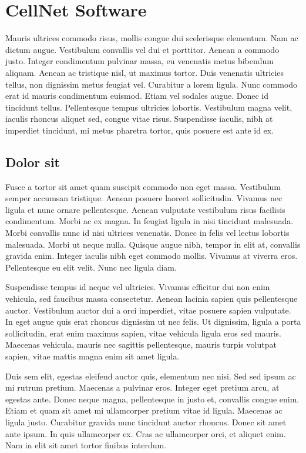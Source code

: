 \section{CellNet Software}
\label{sec:ipsum}
Mauris ultrices commodo risus, mollis congue dui scelerisque elementum. Nam ac dictum augue. Vestibulum convallis vel dui et porttitor. Aenean a commodo justo. Integer condimentum pulvinar massa, eu venenatis metus bibendum aliquam. Aenean ac tristique nisl, ut maximus tortor. Duis venenatis ultricies tellus, non dignissim metus feugiat vel. Curabitur a lorem ligula. Nunc commodo erat id mauris condimentum euismod. Etiam vel sodales augue. Donec id tincidunt tellus. Pellentesque tempus ultricies lobortis. Vestibulum magna velit, iaculis rhoncus aliquet sed, congue vitae risus. Suspendisse iaculis, nibh at imperdiet tincidunt, mi metus pharetra tortor, quis posuere est ante id ex.

\subsection{Dolor sit} %
\label{sub:dolor_sit}
Fusce a tortor sit amet quam suscipit commodo non eget massa. Vestibulum semper accumsan tristique. Aenean posuere laoreet sollicitudin. Vivamus nec ligula et nunc ornare pellentesque. Aenean vulputate vestibulum risus facilisis condimentum. Morbi ac ex magna. In feugiat ligula in nisi tincidunt malesuada. Morbi convallis nunc id nisi ultrices venenatis. Donec in felis vel lectus lobortis malesuada. Morbi ut neque nulla. Quisque augue nibh, tempor in elit at, convallis gravida enim. Integer iaculis nibh eget commodo mollis. Vivamus at viverra eros. Pellentesque eu elit velit. Nunc nec ligula diam.

Suspendisse tempus id neque vel ultricies. Vivamus efficitur dui non enim vehicula, sed faucibus massa consectetur. Aenean lacinia sapien quis pellentesque auctor. Vestibulum auctor dui a orci imperdiet, vitae posuere sapien vulputate. In eget augue quis erat rhoncus dignissim ut nec felis. Ut dignissim, ligula a porta sollicitudin, erat enim maximus sapien, vitae vehicula ligula eros sed mauris. Maecenas vehicula, mauris nec sagittis pellentesque, mauris turpis volutpat sapien, vitae mattis magna enim sit amet ligula.

Duis sem elit, egestas eleifend auctor quis, elementum nec nisi. Sed sed ipsum ac mi rutrum pretium. Maecenas a pulvinar eros. Integer eget pretium arcu, at egestas ante. Donec neque magna, pellentesque in justo et, convallis congue enim. Etiam et quam sit amet mi ullamcorper pretium vitae id ligula. Maecenas ac ligula justo. Curabitur gravida nunc tincidunt auctor rhoncus. Donec sit amet ante ipsum. In quis ullamcorper ex. Cras ac ullamcorper orci, et aliquet enim. Nam in elit sit amet tortor finibus interdum.

